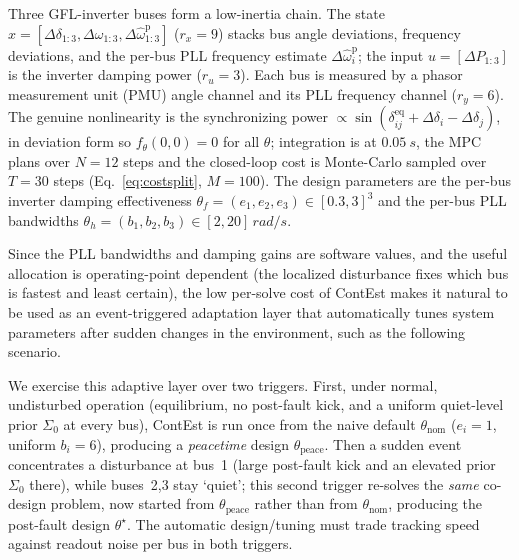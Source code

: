 \documentclass[twocolumn,amsthm]{autart}
\begin{document}
Three GFL-inverter buses form a low-inertia chain. The state
$x=[\Delta\delta_{1:3},\Delta\omega_{1:3},\Delta\hat\omega^{\mathrm p}_{1:3}]$
($r_x=9$) stacks bus angle deviations, frequency deviations, and the per-bus PLL frequency estimate $\Delta\hat\omega^{\mathrm p}_i$; the input
$u=[\Delta P_{1:3}]$ is the inverter damping power ($r_u=3$). Each bus is measured
by a phasor measurement unit (PMU) angle channel and its PLL frequency channel
($r_y=6$). The genuine
nonlinearity is the synchronizing power $\propto\sin(\delta^{\mathrm{eq}}_{ij}+
\Delta\delta_i-\Delta\delta_j)$, in deviation form so $f_\theta(0,0)=0$ for
all $\theta$; integration is at $\SI{0.05}{s}$, the MPC plans over $N=12$ steps and
the closed-loop cost is Monte-Carlo sampled over $T=30$ steps (Eq.~\eqref{eq:costsplit}, $M=100$). The design parameters
are the per-bus inverter damping effectiveness
$\theta_f=(e_1,e_2,e_3)\in[0.3,3]^3$ and the per-bus PLL bandwidths
$\theta_h=(b_1,b_2,b_3)\in[2,20]\,\si{rad/s}$. 


Since the PLL bandwidths and damping gains are software values, and the useful allocation is operating-point dependent (the localized disturbance
fixes which bus is fastest and least certain), the low per-solve cost of
ContEst makes it natural to be used as an event-triggered adaptation layer that automatically tunes system parameters after sudden changes in the environment, such as the following scenario.

We exercise this adaptive layer over two triggers. First, under normal,
undisturbed operation (equilibrium, no post-fault kick, and a uniform
quiet-level prior $\Sigma_0$ at every bus), ContEst is run once from the naive
default $\theta_{\mathrm{nom}}$ ($e_i=1$, uniform $b_i=6$), producing a
\emph{peacetime} design $\theta_{\mathrm{peace}}$. Then a sudden event
concentrates a disturbance at bus~1 (large post-fault kick and an elevated
prior $\Sigma_0$ there), while buses~2,3 stay `quiet'; this second trigger
re-solves the \emph{same} co-design problem, now started from
$\theta_{\mathrm{peace}}$ rather than from $\theta_{\mathrm{nom}}$, producing
the post-fault design $\theta^\star$. The automatic design/tuning
must trade tracking speed against readout noise per bus in both triggers.
\end{document}
